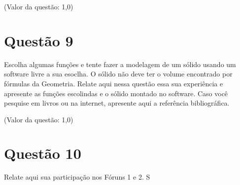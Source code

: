\documentclass[10pt,a4paper]{article}
\begin{document}
	(Valor da questão: 1,0)
	
	
	\section*{Questão 9}
	
	Escolha algumas funções e tente fazer a modelagem de um sólido usando um software livre a sua esoclha. O sólido não deve ter o volume encontrado por fórmulas da Geometria. Relate aqui nessa questão essa sua experiência e apresente as funções escolindas e o sólido montado no software. Caso você pesquise em livros ou na internet, apresente aqui a referência bibliográfica.
	
	(Valor da questão: 1,0)
	
	\section*{Questão 10}
	
	Relate aqui sua participação nos Fóruns 1 e 2.
	S
\end{document}
